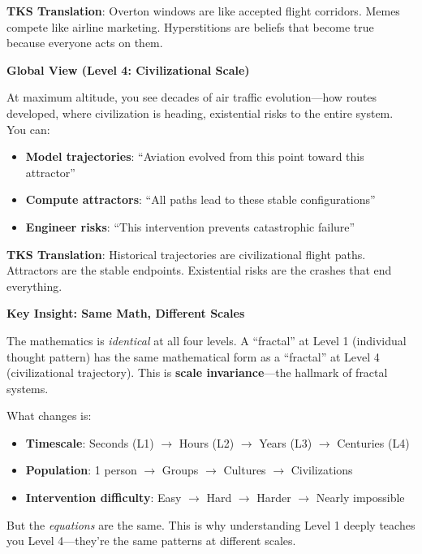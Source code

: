 \documentclass[11pt,twoside]{book}
\begin{document}
\begin{tcolorbox}[colback=green!5!white,colframe=green!65!black,title=\textbf{The Control Tower Metaphor},breakable]
\textbf{TKS Translation}: Overton windows are like accepted flight corridors. Memes compete
like airline marketing. Hyperstitions are beliefs that become true because everyone acts
on them.

\bigskip
\textbf{Global View (Level 4: Civilizational Scale)}

At maximum altitude, you see decades of air traffic evolution---how routes developed,
where civilization is heading, existential risks to the entire system. You can:
\begin{itemize}
    \item \textbf{Model trajectories}: ``Aviation evolved from this point toward this attractor''
    \item \textbf{Compute attractors}: ``All paths lead to these stable configurations''
    \item \textbf{Engineer risks}: ``This intervention prevents catastrophic failure''
\end{itemize}

\textbf{TKS Translation}: Historical trajectories are civilizational flight paths.
Attractors are the stable endpoints. Existential risks are the crashes that end everything.

\bigskip
\textbf{Key Insight: Same Math, Different Scales}

The mathematics is \emph{identical} at all four levels. A ``fractal'' at Level 1
(individual thought pattern) has the same mathematical form as a ``fractal'' at Level 4
(civilizational trajectory). This is \textbf{scale invariance}---the hallmark of fractal systems.

What changes is:
\begin{itemize}
    \item \textbf{Timescale}: Seconds (L1) $\to$ Hours (L2) $\to$ Years (L3) $\to$ Centuries (L4)
    \item \textbf{Population}: 1 person $\to$ Groups $\to$ Cultures $\to$ Civilizations
    \item \textbf{Intervention difficulty}: Easy $\to$ Hard $\to$ Harder $\to$ Nearly impossible
\end{itemize}

But the \emph{equations} are the same. This is why understanding Level 1 deeply
teaches you Level 4---they're the same patterns at different scales.

\end{tcolorbox}

\end{document}
